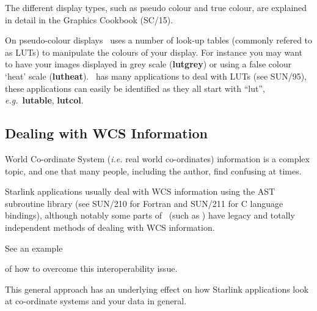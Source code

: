 \documentclass[twoside,11pt]{article}
\newcommand{\htmlref}[2]{#1}
\newcommand{\xref}[3]{#1}
\newcommand{\xlabel}[1]{}
\begin{document}
{The different display types, such as \xref{pseudo
colour}{sc15}{sc15_pseudo} and \xref{true colour}{sc15}{sc15_true},
are explained in detail in the \xref{Graphics Cookbook}{sc15}{} (SC/15).

On \xref{pseudo-colour displays}{sc15}{sc15_pseudo} \KAPPA\ uses a
number of \xref{look-up tables}{sun95}{se_lookuptables} (commonly
refered to as LUTs) to manipulate the colours of your display.  For
instance you may want to have your images displayed in grey scale
(\xref{{\bf lutgrey}}{sun95}{LUTGREY}) or using a false colour `heat'
scale (\xref{{\bf lutheat}}{sun95}{LUTHEAT}).  \KAPPA\ has many applications to
deal with LUTs (see \xref{SUN/95}{sun95}{}), these applications can
easily be identified as they all start with ``lut'', \emph{e.g.}\
\xref{{\bf lutable}}{sun95}{LUTABLE}, \xref{{\bf lutcol}}{sun95}{LUTCOL}.

\subsection{\xlabel{sc16_wcs}Dealing with WCS Information\label{sc16_wcs}}

\xref{World Co-ordinate System}{sun95}{se_wcsuse} (\emph{i.e.} real
world co-ordinates) information is a complex topic, and one that many people,
including the author, find confusing at times.

Starlink applications usually deal with WCS information using the
\xref{\footnotesize{AST}\normalsize}{sun210}{} subroutine library (see
SUN/210 for Fortran and \xref{SUN/211}{sun211}{} for C language
bindings), although notably some parts of \FIGARO\ (such as \SPECDRE)
have legacy and totally independent methods of dealing with WCS
information. 
\begin{htmlonly}
See \htmlref{an example}{sc16_wcs2axis}
\end{htmlonly} 
of how to overcome this interoperability issue.

This general approach has an underlying effect on how
Starlink applications look at co-ordinate systems and your data in
general.

}
\end{document}
